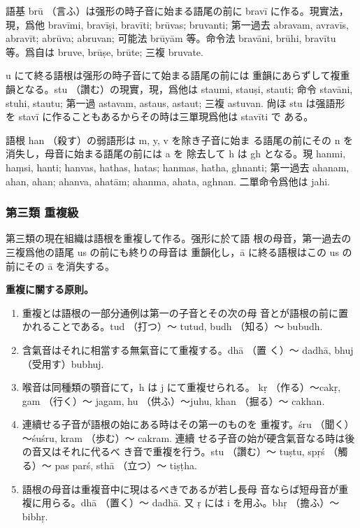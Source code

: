 \numberParagraph
語基 brū （言ふ）は强形の時子音に始まる語尾の前に
bravī に作る。現實法，現，爲他 bravīmi, bravīṣi, bravīti;
brūvas; bruvanti; 第一過去 abravam, avravīs, abravīt;
abrūva; abruvan; 可能法 brūyām 等。命令法 bravāni, brūhi,
bravītu 等。爲自は bruve, brūṣe, brūte; 三複 bruvate.

\numberParagraph
u にて終る語根は强形の時子音にて始まる語尾の前には
重韻にあらずして複重韻となる。stu （讚む）の現實，現，爲他は
staumi, stauṣi, stauti; 命令 stavāni, stuhi, stautu; 第一過
astavam, astaus, astaut; 三複 astuvan. 尙ほ stu は强語形
を stavī に作ることもあるからその時は三單現爲他は stavīti で
ある。

\numberParagraph
語根 han （殺す）の弱語形は m, y, v を除き子音に始ま
る語尾の前にその n を消失し，母音に始まる語尾の前には a を
除去して h は gh となる。現 hanmi, haṃsi, hanti; hanvas,
hathas, hatas; hanmas, hatha, ghnanti; 第一過去 ahanam,
ahan, ahan; ahanva, ahatām; ahanma, ahata,
aghnan. 二單命令爲他は jahi.

\subsubsection{第三類 重複級}
\numberParagraph \label{np:145}
第三類の現在組織は語根を重複して作る。强形に於て語
根の母音，第一過去の三複爲他の語尾 us の前にも終りの母音は
重韻化し，ā に終る語根はこの us の前にその ā を消失する。

\numberParagraph \label{np:146} \textbf{重複に關する原則。}
\begin{enumerate}[label=(\alph*)]
\item 重複とは語根の一部分通例は第一の子音とその次の母
音とが語根の前に置かれることである。tud （打つ）～
tutud, budh （知る）～ bubudh.
\item 含氣音はそれに相當する無氣音にて重複する。dhā （置
く）～ dadhā, bhuj （受用す）bubhuj.
\item 喉音は同種類の顎音にて，h は j にて重複せられる。
kṛ （作る）～cakṛ, gam （行く）～ jagam, hu （供ふ）～juhu,
khan （掘る）～ cakhan.
\item 連續せる子音が語根の始にある時はその第一のものを
重複す。śru （聞く）～śuśru, kram （歩む）～ cakram. 連續
せる子音の始が硬含氣音なる時は後の音又はそれに代るべ
き音で重複を行う。stu （讚む）～ tuṣtu, spṛś （觸る）～ pas\-%
parś, sthā （立つ）～ tiṣṭha.
\item 語根の母音は重複音中に現はるべきであるが若し長母
音ならば短母音が重複に用らる。dhā （置く）～ dadhā. 又
ṛ には i を用ふ。bhṛ （擔ふ）～ bibhṛ.
\end{enumerate}

